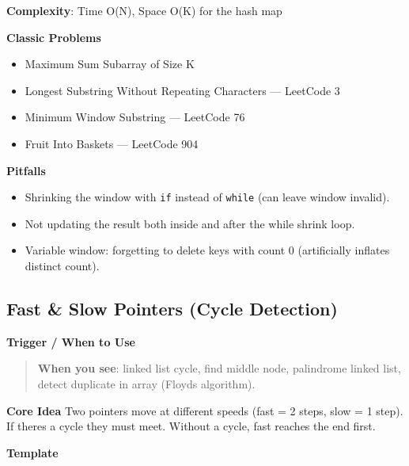 \documentclass[11pt]{article}
\providecommand{\tightlist}{\setlength{\itemsep}{1pt}\setlength{\parskip}{0pt}}
\begin{document}
\textbf{Complexity}: Time O(N), Space O(K) for the hash map

\textbf{Classic Problems}

\begin{itemize}
\tightlist
\item
  Maximum Sum Subarray of Size K
\item
  Longest Substring Without Repeating Characters --- LeetCode 3
\item
  Minimum Window Substring --- LeetCode 76
\item
  Fruit Into Baskets --- LeetCode 904
\end{itemize}

\textbf{Pitfalls}

\begin{itemize}
\tightlist
\item
  Shrinking the window with \texttt{if} instead of \texttt{while} (can leave window invalid).
\item
  Not updating the result both inside and after the while shrink loop.
\item
  Variable window: forgetting to delete keys with count 0 (artificially inflates distinct count).
\end{itemize}

\subsection{Fast \& Slow Pointers (Cycle Detection)}\label{fast--slow-pointers-cycle-detection}

\textbf{Trigger / When to Use}

\begin{quote}
\textbf{When you see}: linked list cycle, find middle node, palindrome linked list, detect duplicate in array (Floyd\textquotesingle s algorithm).
\end{quote}

\textbf{Core Idea}
Two pointers move at different speeds (fast = 2 steps, slow = 1 step). If there\textquotesingle s a cycle they must meet. Without a cycle, fast reaches the end first.

\textbf{Template}

\end{document}
